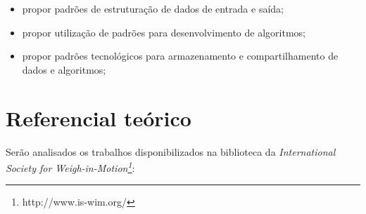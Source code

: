 \documentclass{ufscThesis}
\begin{document}
\begin{itemize}
\item  propor padrões de estruturação de dados de entrada e saída;
\item  propor utilização de padrões para desenvolvimento de algoritmos;
\item  propor padrões tecnológicos para armazenamento e compartilhamento de dados e algoritmos;
\end{itemize} 

\section{Referencial teórico}\label{introducao-referencial}
Serão analisados os trabalhos disponibilizados na biblioteca da \textit{International Society for Weigh-in-Motion\footnote{http://www.is-wim.org/}}:
\end{document}
